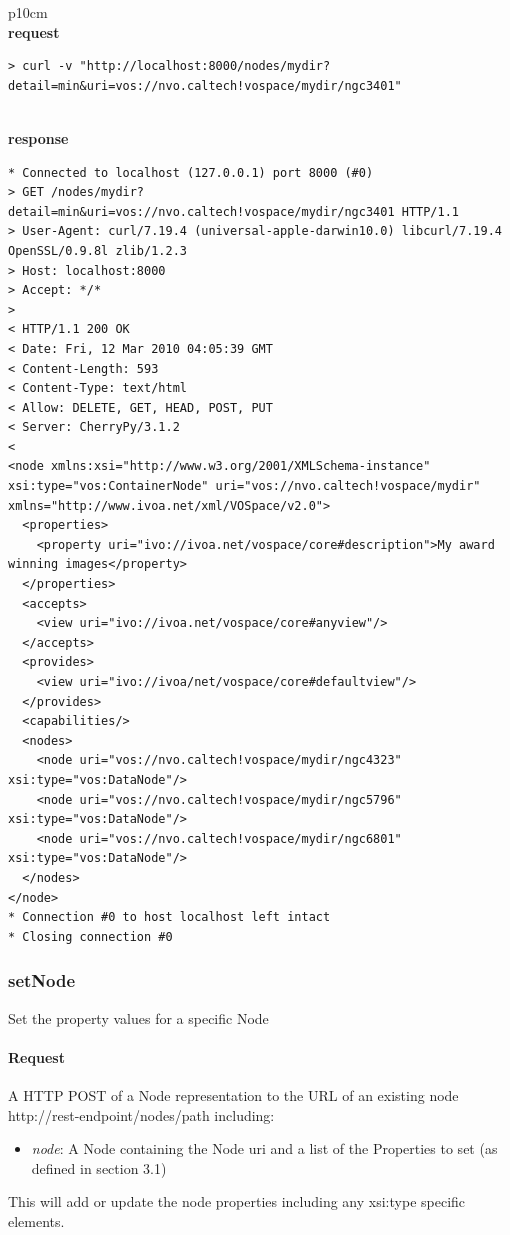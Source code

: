 \documentclass[11pt,a4paper]{ivoa}
\begin{document}
\begin{tabular}{ p{10cm} }
\\
\textbf{request} \\
\begin{lstlisting}
> curl -v "http://localhost:8000/nodes/mydir?detail=min&uri=vos://nvo.caltech!vospace/mydir/ngc3401"
\end{lstlisting} \\
\textbf{response} \\
\begin{lstlisting}
* Connected to localhost (127.0.0.1) port 8000 (#0)
> GET /nodes/mydir?detail=min&uri=vos://nvo.caltech!vospace/mydir/ngc3401 HTTP/1.1
> User-Agent: curl/7.19.4 (universal-apple-darwin10.0) libcurl/7.19.4 OpenSSL/0.9.8l zlib/1.2.3
> Host: localhost:8000
> Accept: */*
> 
< HTTP/1.1 200 OK
< Date: Fri, 12 Mar 2010 04:05:39 GMT
< Content-Length: 593
< Content-Type: text/html
< Allow: DELETE, GET, HEAD, POST, PUT
< Server: CherryPy/3.1.2
< 
<node xmlns:xsi="http://www.w3.org/2001/XMLSchema-instance"
xsi:type="vos:ContainerNode" uri="vos://nvo.caltech!vospace/mydir"
xmlns="http://www.ivoa.net/xml/VOSpace/v2.0">
  <properties>
    <property uri="ivo://ivoa.net/vospace/core#description">My award winning images</property>
  </properties>
  <accepts>
    <view uri="ivo://ivoa.net/vospace/core#anyview"/>
  </accepts>
  <provides>
    <view uri="ivo://ivoa/net/vospace/core#defaultview"/>
  </provides>
  <capabilities/>
  <nodes>
    <node uri="vos://nvo.caltech!vospace/mydir/ngc4323" xsi:type="vos:DataNode"/>
    <node uri="vos://nvo.caltech!vospace/mydir/ngc5796" xsi:type="vos:DataNode"/>
    <node uri="vos://nvo.caltech!vospace/mydir/ngc6801" xsi:type="vos:DataNode"/>
  </nodes>
</node>
* Connection #0 to host localhost left intact
* Closing connection #0
\end{lstlisting}
\end{tabular}

\subsubsection{setNode}
Set the property values for a specific Node

\paragraph{Request}
A HTTP POST of a Node representation to the URL of an existing node http://rest-endpoint/nodes/path including:
\begin{itemize}
    \item \emph{node}: A Node containing the Node uri and a list of the Properties to set (as defined in section 3.1)
\end{itemize}
This will add or update the node properties including any xsi:type specific elements.
\end{document}
